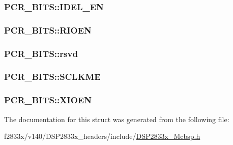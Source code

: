 \subsubsection[{I\+D\+E\+L\+\_\+\+E\+N}]{ P\+C\+R\+\_\+\+B\+I\+T\+S\+::\+I\+D\+E\+L\+\_\+\+E\+N}\label{struct_p_c_r___b_i_t_s_a8b3bb2c3ef8cd32be56374afd55e4332}
\hypertarget{struct_p_c_r___b_i_t_s_a2bdda62ab7b23bb6225a838349b0a8b1}{}
\subsubsection[{R\+I\+O\+E\+N}]{ P\+C\+R\+\_\+\+B\+I\+T\+S\+::\+R\+I\+O\+E\+N}\label{struct_p_c_r___b_i_t_s_a2bdda62ab7b23bb6225a838349b0a8b1}
\hypertarget{struct_p_c_r___b_i_t_s_a095c3730557e29e25c06001c8999e69e}{}
\subsubsection[{rsvd}]{ P\+C\+R\+\_\+\+B\+I\+T\+S\+::rsvd}\label{struct_p_c_r___b_i_t_s_a095c3730557e29e25c06001c8999e69e}
\hypertarget{struct_p_c_r___b_i_t_s_a5928a328051c88b72678df28854b2422}{}
\subsubsection[{S\+C\+L\+K\+M\+E}]{ P\+C\+R\+\_\+\+B\+I\+T\+S\+::\+S\+C\+L\+K\+M\+E}\label{struct_p_c_r___b_i_t_s_a5928a328051c88b72678df28854b2422}
\hypertarget{struct_p_c_r___b_i_t_s_a0ccd23b6b79b32c68d7c4c2e341f633f}{}
\subsubsection[{X\+I\+O\+E\+N}]{ P\+C\+R\+\_\+\+B\+I\+T\+S\+::\+X\+I\+O\+E\+N}\label{struct_p_c_r___b_i_t_s_a0ccd23b6b79b32c68d7c4c2e341f633f}


The documentation for this struct was generated from the following file\+:\begin{DoxyCompactItemize}
\item 
f2833x/v140/\+D\+S\+P2833x\+\_\+headers/include/\hyperlink{_d_s_p2833x___mcbsp_8h}{D\+S\+P2833x\+\_\+\+Mcbsp.\+h}\end{DoxyCompactItemize}
